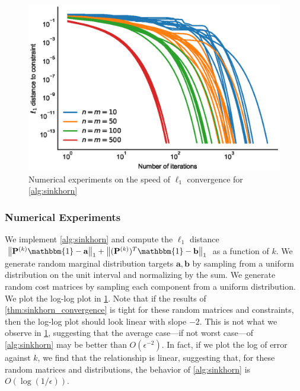 \documentclass{article}
\renewcommand{\b}{\mathbf}
\newcommand{\one}{\mathbbm{1}}
\theoremstyle{definition}
\theoremstyle{remark}
\begin{document}
\begin{figure}[tb]
  \centering
  \includegraphics{figs/sinkhorn.eps}
  \caption{Numerical experiments on the speed of $\ell_1$ convergence for \cref{alg:sinkhorn}}
  \label{fig:sinkhorn_convergence}
\end{figure}



\subsubsection{Numerical Experiments}
\label{sub:numerical_sink}
We implement \cref{alg:sinkhorn} and compute the $\ell_1$ distance $\norm{\b P^{
(k)}\one - \b a}_1 + \norm{(\b P^{(k)})^T\one - \b b}_1$ as a function of $k$.
 We generate random marginal distribution targets $\b a, \b b$ by sampling
 from a uniform distribution on the unit interval and normalizing by the sum. We
 generate random cost matrices by sampling each component from a uniform
 distribution. We plot the log-log plot in \cref{fig:sinkhorn_convergence}. Note
 that if the results of \cref{thm:sinkhorn_convergence} is tight for these
 random matrices and constraints, then the log-log plot should look linear with
 slope $-2$. This is not what we observe in \cref{fig:sinkhorn_convergence},
 suggesting that the average case---if not worst case---of \cref{alg:sinkhorn}
 may be better than $O(\epsilon^{-2})$. In fact, if we plot the log of error
 against $k$, we find that the relationship is linear, suggesting that, for these
 random matrices and distributions, the behavior of \cref{alg:sinkhorn} is
 $O(\log(1/\epsilon))$. 

\end{document}
